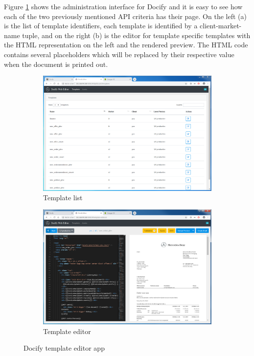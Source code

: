 Figure \ref{fig:docify} shows the administration interface for Docify and it is easy to see how each of the two previously mentioned API criteria has their page. On the left (a) is the list of template identifiers, each template is identified by a client-market-name tuple, and on the right (b) is the editor for template specific templates with the HTML representation on the left and the rendered preview. The HTML code contains several placeholders which will be replaced by their respective value when the document is printed out.

\begin{figure}
  \centering
  \begin{subfigure}[b]{0.5\linewidth}
    \includegraphics[width=\linewidth]{assets/docify-template-list.png}
    \caption{Template list}
  \end{subfigure}
  \begin{subfigure}[b]{0.5\linewidth}
    \includegraphics[width=\linewidth]{assets/docify-editor.png}
    \caption{Template editor}
  \end{subfigure}
  \caption{Docify template editor app}
  \label{fig:docify}
\end{figure}

